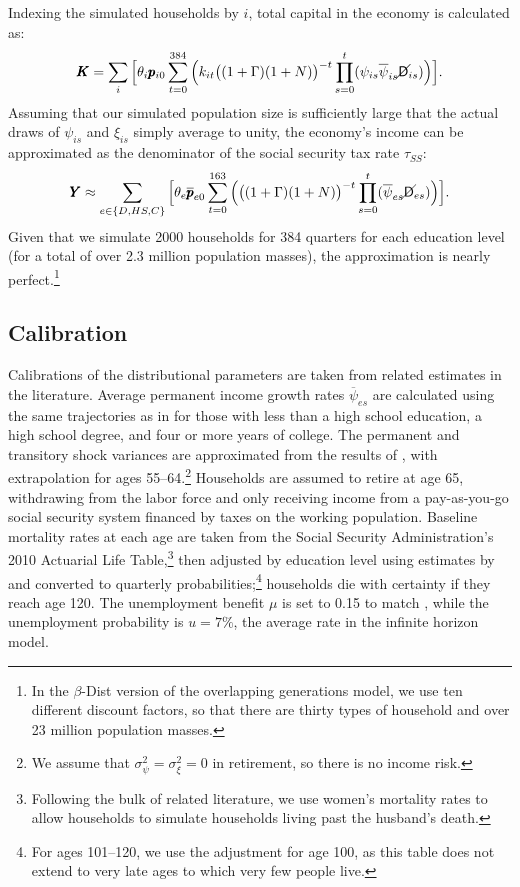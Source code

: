 \documentclass{econtex}\usepackage[pdftex]{graphicx}\usepackage{epstopdf} \usepackage[pdftex]{hyperref}
\newcommand{\Discount}{\ensuremath{\beta}}
\newcommand{\KLev}{\ensuremath{\pmb{K}}}
\newcommand{\kRat}{\ensuremath{k}}
\newcommand{\PDies}{\ensuremath{\mathsf{D}}}
\newcommand{\pLev}{\ensuremath{\pmb{p}}}
\newcommand{\PLives}{\ensuremath{\cancel{\PDies}}}
\newcommand{\pshk}{\psi} %
\newcommand{\tshk}{\xi} %
\newcommand{\urate}{\ensuremath{u}}
\newcommand{\YLev}{\ensuremath{\pmb{Y}}}
\begin{document}
Indexing the simulated households by $i$, total capital in the economy is calculated as:
\begin{equation*}
\KLev = \sum_i \Big[ \theta_i \pLev_{i0} \sum_{t = 0}^{384} \Big( \kRat_{it} \big((1 + \Gamma)(1+N)\big)^{-t} \prod_{s=0}^t ( \pshk_{is} \overline{\pshk}_{is} \PLives_{is} ) \Big) \Big].
\end{equation*}
Assuming that our simulated population size is sufficiently large that the actual draws of $\pshk_{is}$ and $\tshk_{is}$ simply average to unity, the economy's income can be approximated as the denominator of the social security tax rate $\tau_{SS}$:
\begin{equation*}
\YLev \approx \sum_{e \in \{D,HS,C\}} \Big[ \theta_e \overline{\pLev}_{e0} \sum_{t = 0}^{163} \Big( \big((1 + \Gamma)(1+N)\big)^{-t} \prod_{s=0}^t ( \overline{\pshk}_{es} \PLives_{es} ) \Big) \Big].
\end{equation*}
Given that we simulate 2000 households for 384 quarters for each education level (for a total of over 2.3 million population masses), the approximation is nearly perfect.\footnote{In the \Discount-Dist version of the overlapping generations model, we use ten different discount factors, so that there are thirty types of household and over 23 million population masses.}

\subsection{Calibration}

Calibrations of the distributional parameters are taken from related estimates in the literature.  Average permanent income growth rates $\overline{\pshk}_{es}$ are calculated using the same trajectories as in \cite{Cagetti} for those with less than a high school education, a high school degree, and four or more years of college.  The permanent and transitory shock variances are approximated from the results of \cite{SabelhausSong}, with extrapolation for ages 55--64.\footnote{We assume that $\sigma^2_{\pshk} = \sigma^2_{\tshk} = 0$ in retirement, so there is no income risk.}  Households are assumed to retire at age 65, withdrawing from the labor force and only receiving income from a pay-as-you-go social security system financed by taxes on the working population.  Baseline mortality rates at each age are taken from the Social Security Administration's 2010 Actuarial Life Table,\footnote{Following the bulk of related literature, we use women's mortality rates to allow households to simulate households living past the husband's death.} then adjusted by education level using estimates by \cite{BrownLiebmanPollet} and converted to quarterly probabilities;\footnote{For ages 101--120, we use the adjustment for age 100, as this table does not extend to very late ages to which very few people live.} households die with certainty if they reach age 120.  The unemployment benefit $\mu$ is set to 0.15 to match \cite{Cagetti}, while the unemployment probability is $\urate = 7\%$, the average rate in the infinite horizon model.
\end{document}
